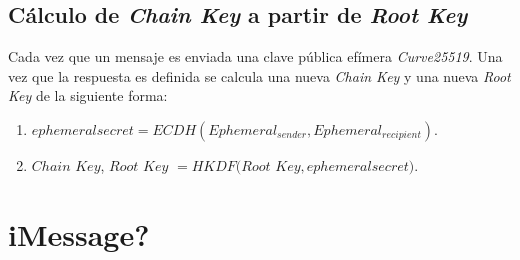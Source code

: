 \subsection{Cálculo de \emph{Chain Key} a partir de \emph{Root Key}}
Cada vez que un mensaje es enviada una clave pública efímera \emph{Curve25519}. Una vez que la respuesta es definida se calcula una nueva \emph{Chain Key} y una nueva \emph{Root Key} de la siguiente forma:
\begin{enumerate}
	\item $ephemeral$\textunderscore $secret = ECDH(Ephemeral_{sender}, Ephemeral_{recipient})$.
	\item $Chain$ $Key$, $Root$ $Key$ $= HKDF(Root$ $Key, ephemeral$\textunderscore$secret)$.
\end{enumerate}

\section{iMessage?}

